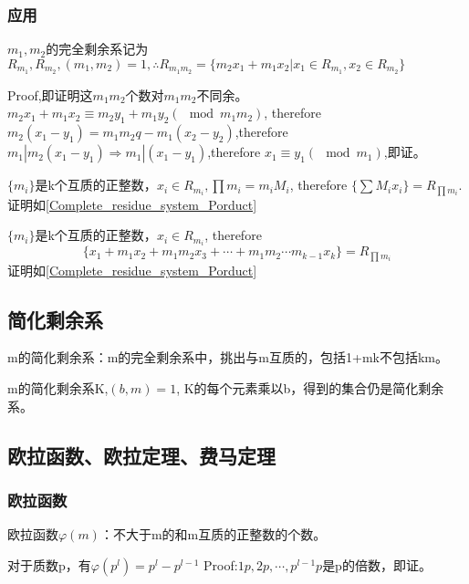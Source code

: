 \documentclass[UTF8]{../09-Mathematics}
\begin{document}
\subsubsection{应用}

\begin{proposition}\label{Complete_residue_system_Porduct}
    $m_1, m_2$的完全剩余系记为$R_{m_1},R_{m_2}, (m_1,m_2) = 1, \therefore R_{m_1m_2} = \{m_2x_1 + m_1x_2 | x_1 \in R_{m_1},x_2 \in R_{m_2} \}$

    Proof,即证明这$m_1m_2$个数对$m_1m_2$不同余。
    $m_2x_1 + m_1x_2 \equiv m_2y_1 + m_1y_2 (\mod m_1m_2)$, therefore
    $m_2(x_1-y_1)= m_1m_2q - m_1(x_2-y_2)$,therefore
    $m_1 | m_2(x_1-y_1) \Rightarrow m_1 | (x_1-y_1)$,therefore
    $x_1 \equiv y_1 (\mod m_1)$,即证。
\end{proposition}

\begin{proposition}
    $\{m_i\}$是k个互质的正整数，$x_i \in R_{m_i},\prod m_i = m_iM_i$, therefore $\{\sum M_i x_i \} =  R_{\prod m_i}$.证明如\ref{Complete_residue_system_Porduct}

    $\{m_i\}$是k个互质的正整数，$x_i \in R_{m_i} $, therefore 
    $$\{x_1 + m_1 x_2 + m_1m_2x_3 + \cdots + m_1m_2\cdots m_{k-1}x_k \} =  R_{\prod m_i}$$
    证明如\ref{Complete_residue_system_Porduct}
\end{proposition}



\subsection{简化剩余系}
\begin{proposition}
    m的简化剩余系：m的完全剩余系中，挑出与m互质的，包括1+mk不包括km。

    m的简化剩余系K,$(b,m)= 1$, K的每个元素乘以b，得到的集合仍是简化剩余系。
\end{proposition}



\subsection{欧拉函数、欧拉定理、费马定理}

\subsubsection{欧拉函数}

\begin{definition}
    欧拉函数$\varphi(m)$：不大于m的和m互质的正整数的个数。

    对于质数p，有$\varphi(p^l) = p^l - p^{l-1} $
    Proof:$1p, 2p, \cdots, p^{l-1}p$是p的倍数，即证。
\end{definition}
\end{document}
